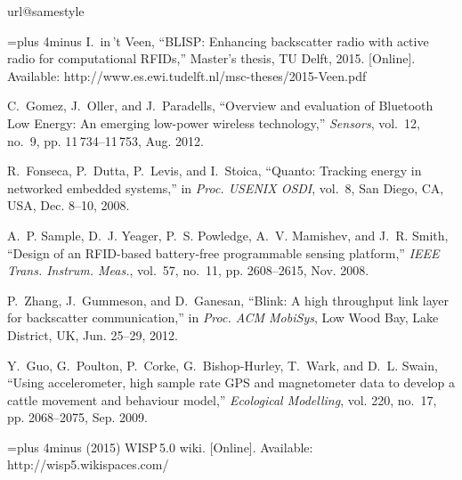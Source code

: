 \documentclass[conference,letterpaper,twoside,final,10pt]{IEEEtran}
\begin{document}
\begin{thebibliography}{10}
\providecommand{\url}[1]{#1}
\csname url@samestyle\endcsname
\providecommand{\newblock}{\relax}
\providecommand{\bibinfo}[2]{#2}
\providecommand{\BIBentrySTDinterwordspacing}{\spaceskip=0pt\relax}
\providecommand{\BIBentryALTinterwordstretchfactor}{4}
\providecommand{\BIBentryALTinterwordspacing}{\spaceskip=\fontdimen2\font plus
\BIBentryALTinterwordstretchfactor\fontdimen3\font minus
  \fontdimen4\font\relax}
\providecommand{\BIBforeignlanguage}[2]{{\expandafter\ifx\csname l@#1\endcsname\relax
\else
\language=\csname l@#1\endcsname
\fi
#2}}
\providecommand{\BIBdecl}{\relax}
\BIBdecl

\BIBentryALTinterwordspacing
I.~{in\,'t Veen}, ``{BLISP}: Enhancing backscatter radio with active radio for
  computational {RFIDs},'' Master's thesis, TU Delft, 2015. [Online].
  Available: \url{http://www.es.ewi.tudelft.nl/msc-theses/2015-Veen.pdf}
\BIBentrySTDinterwordspacing

C.~{Gomez}, J.~{Oller}, and J.~{Paradells}, ``Overview and evaluation of
  {Bluetooth Low Energy}: An emerging low-power wireless technology,''
  \emph{Sensors}, vol.~12, no.~9, pp. 11\,734--11\,753, Aug. 2012.

R.~{Fonseca}, P.~{Dutta}, P.~{Levis}, and I.~{Stoica}, ``Quanto: Tracking
  energy in networked embedded systems,'' in \emph{Proc. {USENIX} {OSDI}},
  vol.~8, San Diego, CA, USA, Dec. 8--10, 2008.

A.~P. {Sample}, D.~J. {Yeager}, P.~S. {Powledge}, A.~V. {Mamishev}, and J.~R.
  {Smith}, ``Design of an {RFID}-based battery-free programmable sensing
  platform,'' \emph{{IEEE} Trans. Instrum. Meas.}, vol.~57, no.~11, pp.
  2608--2615, Nov. 2008.

P.~{Zhang}, J.~{Gummeson}, and D.~{Ganesan}, ``Blink: A high throughput link
  layer for backscatter communication,'' in \emph{Proc. {ACM} {MobiSys}}, Low
  Wood Bay, Lake District, UK, Jun. 25--29, 2012.

Y.~{Guo}, G.~{Poulton}, P.~{Corke}, G.~{Bishop-Hurley}, T.~{Wark}, and D.~L.
  {Swain}, ``Using accelerometer, high sample rate {GPS} and magnetometer data
  to develop a cattle movement and behaviour model,'' \emph{Ecological
  Modelling}, vol. 220, no.~17, pp. 2068--2075, Sep. 2009.

\BIBentryALTinterwordspacing
(2015) {WISP}\,5.0 wiki. [Online]. Available:
  \url{http://wisp5.wikispaces.com/}
\BIBentrySTDinterwordspacing


\end{thebibliography}
\end{document}
